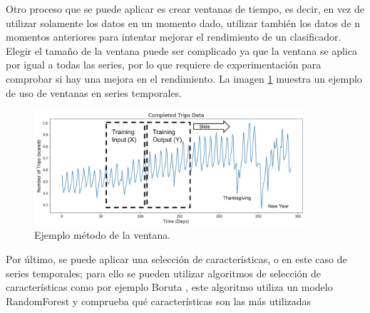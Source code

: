 Otro proceso que se puede aplicar es crear ventanas de tiempo, es decir, en vez de utilizar solamente los datos en un momento dado, utilizar también los datos de n momentos anteriores para intentar mejorar el rendimiento de un clasificador. Elegir el tamaño de la ventana puede ser complicado ya que la ventana se aplica por igual a todas las series, por lo que requiere de experimentación para comprobar si hay una mejora en el rendimiento. La imagen \ref{fig:52} muestra un ejemplo de uso de ventanas en series temporales.\newline


\begin{figure}[H]
	\centering
	\includegraphics[width=100mm]{imagenes/sliding_window_ts.png}
	\caption{Ejemplo método de la ventana.}
	\label{fig:52}
\end{figure}
\verticalspace

Por último, se puede aplicar una selección de características, o en este caso de series temporales; para ello se pueden utilizar algoritmos de selección de características como por ejemplo Boruta \cite{kursa2010boruta}, este algoritmo utiliza un modelo RandomForest y comprueba qué características son las más utilizadas 
